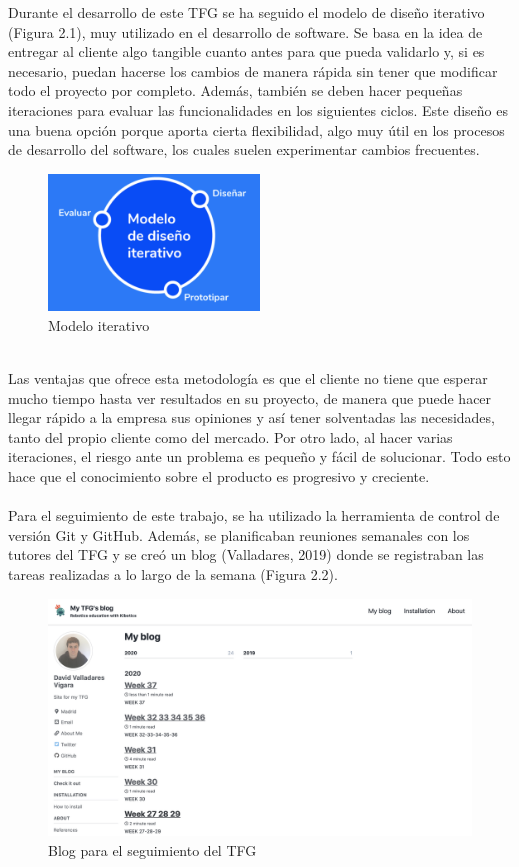 \documentclass{report}
\begin{document}
Durante el desarrollo de este TFG se ha seguido el modelo de diseño iterativo (Figura 2.1), muy utilizado en el desarrollo de software. Se basa en la idea de entregar al cliente algo tangible cuanto antes para que pueda validarlo y, si es necesario, puedan hacerse los cambios de manera rápida sin tener que modificar todo el proyecto por completo. Además, también se deben hacer pequeñas iteraciones para evaluar las funcionalidades en los siguientes ciclos. Este diseño es una buena opción porque aporta cierta flexibilidad, algo muy útil en los procesos de desarrollo del software, los cuales suelen experimentar cambios frecuentes.
\\
\begin{figure}[h!]
  \centering
    \includegraphics[width=0.5\textwidth]{images/metodologia_interativa.png}
  \caption{Modelo iterativo}
  \label{Modelo iterativo}
\end{figure}
\\
Las ventajas que ofrece esta metodología es que el cliente no tiene que esperar mucho tiempo hasta ver resultados en su proyecto, de manera que puede hacer llegar rápido a la empresa sus opiniones y así tener solventadas las necesidades, tanto del propio cliente como del mercado. Por otro lado, al hacer varias iteraciones, el riesgo ante un problema es pequeño y fácil de solucionar. Todo esto hace que el conocimiento sobre el producto es progresivo y creciente.
\\
\\
Para el seguimiento de este trabajo, se ha utilizado la herramienta de control de versión Git y GitHub. Además, se planificaban reuniones semanales con los tutores del TFG y se creó un blog (Valladares, 2019) donde se registraban las tareas realizadas a lo largo de la semana (Figura 2.2).
\\
\begin{figure}[h!]
  \centering
    \includegraphics[width=1\textwidth]{images/blog.png}
  \caption{Blog para el seguimiento del TFG}
  \label{Blog para el seguimiento del TFG}
\end{figure}
\end{document}
